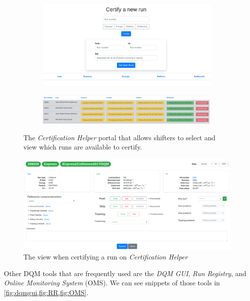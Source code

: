 \begin{figure}
	\centering

	\begin{subfigure}{.7\linewidth}
		\includegraphics*[width=\linewidth,trim= 4in 1.5in 4in 0]{Images/certhelper-portal.png}
	\end{subfigure}

	\begin{subfigure}{\linewidth}
		\includegraphics[width=1\linewidth]{Images/certhelper-list.png}
	\end{subfigure}
	\caption{The \textit{Certification Helper} portal that allows shifters to select and view which runs are available to certify.}
	\label{fig:certhelper-portal}
\end{figure}
\begin{figure}
	\centering
	\includegraphics[width=1\linewidth]{Images/certhelp-cert.png}
	\caption{The view when certifying a run on \textit{Certification Helper}}
	\label{fig:certhelper-cert}
\end{figure}


Other DQM tools that are frequently used are the \textit{DQM GUI}, \textit{Run Registry}, and \textit{Online Monitoring System} (OMS). We can see snippets of those tools in \cref{fig:dqmgui,fig:RR,fig:OMS}.



